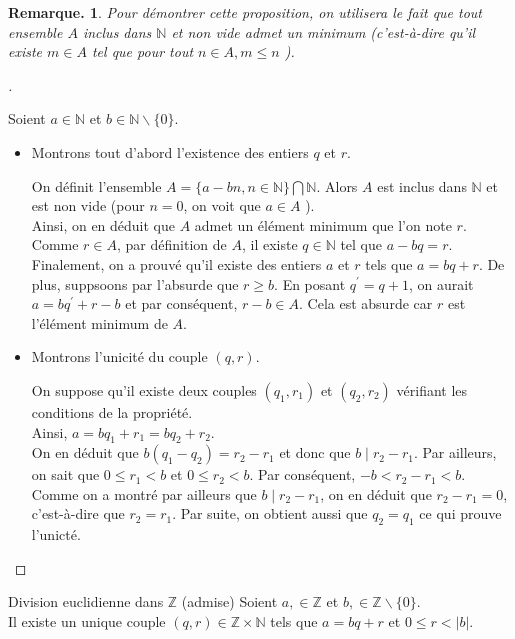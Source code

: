 \documentclass[12pt]{article}
\newcommand{\hideM}[1]{#1}
\theoremstyle{break}
\newtheorem*{remark}{Remarque.}
\newenvironment{demo}[1][\proofname]{%
  \begin{proof}[#1]$ $\newline
}{%
  \end{proof}
}
\begin{document}
\begin{remark}
    Pour démontrer cette proposition, on utilisera le fait que tout ensemble $A$ inclus dans $\mathbb{N}$ et non vide admet un minimum (c'est-à-dire qu'il existe $m \in A$ tel que pour tout $n \in A, m \leqslant n$ ).
\end{remark}
\begin{demo}
    Soient $a \in \mathbb{N}$ et $b \in \mathbb{N} \backslash\{0\}$.
    
    \begin{itemize}[noitemsep,topsep=0pt]
        \item Montrons tout d'abord l'existence des entiers $q$ et $r$.
    
        On définit l'ensemble $A=\{a-b n, n \in \mathbb{N}\} \bigcap \mathbb{N}$. Alors $A$ est inclus dans $\mathbb{N}$ et est non vide (pour $n=0$, on voit que $a \in A$ ).\\
        Ainsi, on en déduit que $A$ admet un élément minimum que l'on note $r$.\\
        Comme $r \in A$, par définition de $A$, il existe $q \in \mathbb{N}$ tel que $a-b q=r$.\\
        Finalement, on a prouvé qu'il existe des entiers $a$ et $r$ tels que $a=b q+r$. De plus, suppsoons par l'absurde que $r \geqslant b$. En posant $q^{\prime}=q+1$, on aurait $a=b q^{\prime}+r-b$ et par conséquent, $r-b \in A$. Cela est absurde car $r$ est l'élément minimum de $A$.
    
        \item Montrons l'unicité du couple $(q, r)$.
    
        On suppose qu'il existe deux couples $\left(q_{1}, r_{1}\right)$ et $\left(q_{2}, r_{2}\right)$ vérifiant les conditions de la propriété.\\
        Ainsi, $a=b q_{1}+r_{1}=b q_{2}+r_{2}$.\\
        On en déduit que $b\left(q_{1}-q_{2}\right)=r_{2}-r_{1}$ et donc que $b \mid r_{2}-r_{1}$. Par ailleurs, on sait que $0 \leqslant r_{1}<b$ et $0 \leqslant r_{2}<b$. Par conséquent, $-b<r_{2}-r_{1}<b$. Comme on a montré par ailleurs que $b \mid r_{2}-r_{1}$, on en déduit que $r_{2}-r_{1}=0$, c'est-à-dire que $r_{2}=r_{1}$. Par suite, on obtient aussi que $q_{2}=q_{1}$ ce qui prouve l'unicté.
    \end{itemize}
\end{demo}

\begin{proposition}{Division euclidienne dans $\mathbb{Z}$ (admise)}{}
    Soient $a, \in \mathbb{Z}$ et $b, \in \mathbb{Z} \backslash\{0\}$.\\
    Il existe un unique couple $(q, r) \in \mathbb{Z} \times \mathbb{N}$ tels que $\hideM{a=b q+r}$ et $\hideM{0 \leqslant r<|b|}$.
\end{proposition}
\end{document}
